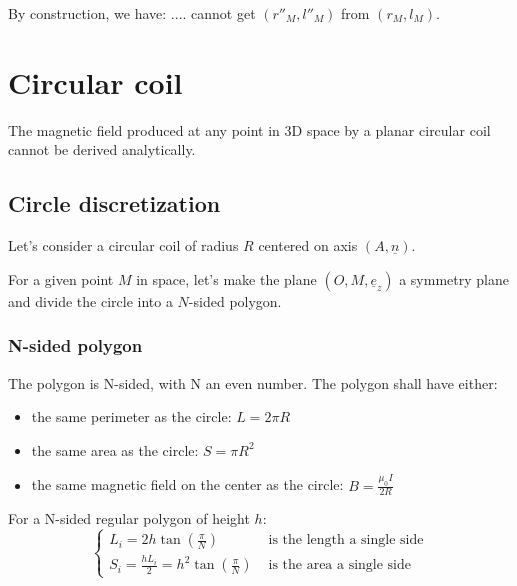 \documentclass[a4paper,11pt,twoside,titlepage,openright]{book}
\numberwithin{equation}{section}
\newcommand{\ud}[1]{\underline{#1}}
\begin{document}
By construction, we have:
.... cannot get $(r''_M, l''_M)$ from $(r_M, l_M)$.



\chapter{Circular coil}
\label{chap:CircularCoil}

The magnetic field produced at any point in 3D space by a planar circular coil
cannot be derived analytically.


\section{Circle discretization}

Let's consider a circular coil of radius $R$ centered on axis $(A, \ud{n})$.

For a given point $M$ in space, let's make the plane $(O, M, \ud{e}_z)$ a
symmetry plane and divide the circle into a $N$-sided polygon.

\subsection{N-sided polygon}
\label{subsect:constraint}

The polygon is N-sided, with N an even number.
The polygon shall have either:
\begin{itemize}
	\item the same perimeter as the circle: $L=2\pi R$
	\item the same area as the circle: $S=\pi R^2$
    \item the same magnetic field on the center as the circle:
        $B=\frac{\mu_0I}{2R}$
\end{itemize}

For a N-sided regular polygon of height $h$:
$$
\left\{
    \begin{array}{ll}
	    L_i = 2h\tan\left(\frac{\pi}{N}\right) & \text{ is the length a single side}\\
		S_i = \frac{hL_i}{2} = h^2\tan\left(\frac{\pi}{N}\right) & \text{ is the area a single side}
	\end{array}
\right.
$$
\end{document}
